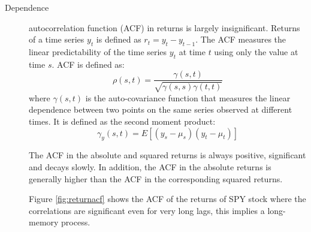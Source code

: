 \begin{description}
\item[Dependence] autocorrelation function (ACF) in returns is largely insignificant. Returns of a time series $y_t$ is defined as $r_t = y_t - y_{t-1}$. The ACF measures the linear predictability of the time series $y_t$ at time $t$ using only the value at time $s$. ACF is defined as:
\begin{equation*}
\rho(s,t) = \frac{\gamma(s,t)}{\sqrt{\gamma(s,s)\gamma(t,t)}}
\end{equation*}
\noindent where $\gamma(s,t)$ is the auto-covariance function that measures the linear dependence between two points on the same series observed at different times. It is defined as the second moment product:
\begin{equation*}
\gamma_y(s,t) = E[(y_s-\mu_s)(y_t - \mu_t)]
\end{equation*}

The ACF in the absolute and squared returns is always positive,
significant and decays slowly. In addition, the ACF in the absolute
returns is generally higher than the ACF in the corresponding
squared returns. 

Figure \ref{fig:returnacf} shows the ACF of the returns of SPY stock where the correlations are significant even
 for very long lags, this implies a long-memory process.
 

\end{description}
